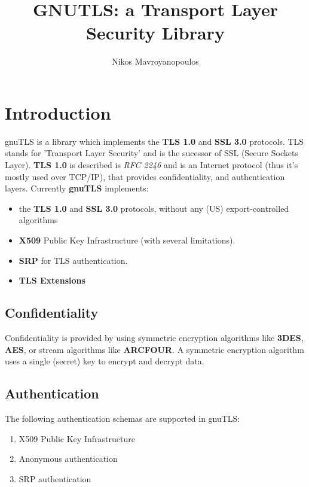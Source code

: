 \documentclass{article}
\begin{document}
\title{GNUTLS: a Transport Layer Security Library}
\author{Nikos Mavroyanopoulos}
\maketitle

\tableofcontents

\section{Introduction}
\par
gnuTLS is a library which implements the {\bf TLS 1.0} and {\bf SSL 3.0} protocols.
TLS stands for 'Transport Layer Security' and is the sucessor of SSL (Secure Sockets Layer).
{\bf TLS 1.0} is described is {\it RFC 2246} and is an Internet protocol (thus it's mostly used over TCP/IP),
that provides confidentiality, and authentication layers. Currently {\bf gnuTLS} implements:
\begin{itemize}
 \item the {\bf TLS 1.0} and {\bf{ SSL 3.0}} protocols, without any (US) export-controlled algorithms
 \item {\bf X509} Public Key Infrastructure (with several limitations).
 \item {\bf SRP} for TLS authentication.
 \item {\bf TLS Extensions}
\end{itemize}

\subsection{Confidentiality}
\par
Confidentiality is provided by using symmetric encryption algorithms like {\bf 3DES}, {\bf AES}, or
stream algorithms like {\bf ARCFOUR}. A symmetric encryption algorithm uses a single (secret) key
to encrypt and decrypt data.

\subsection{Authentication}
\par
The following authentication schemas are supported in gnuTLS:
\begin{enumerate}
 \item X509 Public Key Infrastructure
 \item Anonymous authentication
 \item SRP authentication
\end{enumerate}
\end{document}

